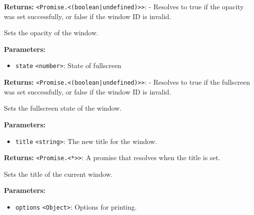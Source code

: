 \documentclass[12pt,a4paper]{article}
\begin{document}
\noindent \textbf{Returns:} \texttt{<Promise.<(boolean|undefined)>>}: - Resolves to \textasciigrave{}true\textasciigrave{} if the opacity was set successfully, or \textasciigrave{}false\textasciigrave{} if the window ID is invalid.

\noindent Sets the opacity of the window.

\vspace{5mm}
\noindent {}


\noindent \textbf{Parameters:}
\begin{itemize}
  \item \texttt{state} \texttt{<number>}: State of fullscreen
\end{itemize}

\noindent \textbf{Returns:} \texttt{<Promise.<(boolean|undefined)>>}: - Resolves to \textasciigrave{}true\textasciigrave{} if the fullscreen was set successfully, or \textasciigrave{}false\textasciigrave{} if the window ID is invalid.

\noindent Sets the fullscreen state of the window.

\vspace{5mm}
\noindent {}


\noindent \textbf{Parameters:}
\begin{itemize}
  \item \texttt{title} \texttt{<string>}: The new title for the window.
\end{itemize}

\noindent \textbf{Returns:} \texttt{<Promise.<*>>}: A promise that resolves when the title is set.

\noindent Sets the title of the current window.

\vspace{5mm}
\noindent {}


\noindent \textbf{Parameters:}
\begin{itemize}
  \item \texttt{options} \texttt{<Object>}: Options for printing.
\end{itemize}
\end{document}
